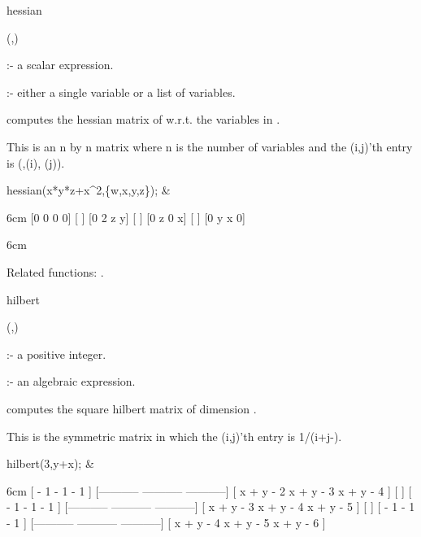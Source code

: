 \begin{Operator}{hessian}

\begin{Syntax}
(,)
\end{Syntax}

           :- a scalar expression. 

 :- either a single variable or a list of 
                         variables.

 computes the hessian matrix of  w.r.t. the 
variables in .

This is an n by n matrix where n is the number of variables and the 
(i,j)'th  entry is (,(i),
(j)).

\begin{Examples}

hessian(x*y*z+x^2,\{w,x,y,z\}); &
\begin{multilineoutput}{6cm}
[0  0  0  0]
[          ]
[0  2  z  y]
[          ]
[0  z  0  x]
[          ]
[0  y  x  0]
\end{multilineoutput}{6cm}

\end{Examples}

Related functions: .

\end{Operator}


\begin{Operator}{hilbert}

\begin{Syntax}
(,)
\end{Syntax}

 :- a positive integer. 

         :- an algebraic expression.

 computes the square hilbert matrix of dimension 
. 

This is the symmetric matrix in which the (i,j)'th entry is 
1/(i+j-).

\begin{Examples}

hilbert(3,y+x); &
\begin{multilineoutput}{6cm}
[    - 1          - 1          - 1    ]
[-----------  -----------  -----------]
[ x + y - 2    x + y - 3    x + y - 4 ]
[                                     ]
[    - 1          - 1          - 1    ]
[-----------  -----------  -----------]
[ x + y - 3    x + y - 4    x + y - 5 ]
[                                     ]
[    - 1          - 1          - 1    ]
[-----------  -----------  -----------]
[ x + y - 4    x + y - 5    x + y - 6 ]
\end{multilineoutput}

\end{Examples}

\end{Operator}


